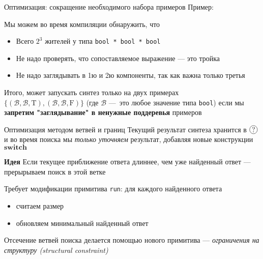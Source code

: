 \documentclass[aspectratio=169
  , xcolor={svgnames}
  , hyperref={ colorlinks,citecolor=Blue
             , linkcolor=DarkRed,urlcolor=DarkBlue}
  , russian
  ]{beamer}
\newcommand{\primi}[1]{\ensuremath{\mathbf{#1}}}
\newcommand*\circled[1]{\tikz[baseline=(char.base)]{
    \node[shape=circle,draw,inner sep=1pt] (char) {#1};}}
\begin{document}

\begin{frame}{Оптимизация: сокращение необходимого набора примеров}
Пример:
\improvementA
\vspace{1em}

Мы можем во время компиляции обнаружить, что
\begin{itemize}
\item Всего $2^3$ жителей у типа \lstinline=bool * bool * bool=
\item Не надо проверять, что сопоставляемое выражение --- это тройка
\item Не надо заглядывать в 1ю и 2ю компоненты, так как важна только третья 
\end{itemize}
\vspace{1em}


Итого, может запускать синтез только на двух примерах $\{(\mathcal{B},\mathcal{B},\text{T}),(\mathcal{B},\mathcal{B},\text{F})\}$
(где $\mathcal{B}$ ---~это любое значение типа \lstinline=bool=)
если мы \textbf{запретим "заглядывание" в ненужные поддеревья} примеров
\end{frame}


\begin{frame}{Оптимизация методом ветвей и границ}
Текущий результат синтеза хранится в  $\circled{?}$ и во время поиска 
мы \emph{только уточняем} результат, добавляя новые конструкции $\primi{switch}$ \\

\begin{alertblock}{\textbf{Идея}}
Если текущее приближение ответа длиннее, чем уже найденный ответ --- прерырываем поиск в этой ветке
\end{alertblock}

Требует модификации примитива \miniKanren{} \lstinline=run=: для каждого найденного ответа
\begin{itemize}
\item считаем размер
\item обновляем минимальный найденный ответ
\end{itemize}

Отсечение ветвей поиска делается помощью нового примитива --- \emph{ограничения на структуру (structural constraint)}

\end{frame}
\end{document}
